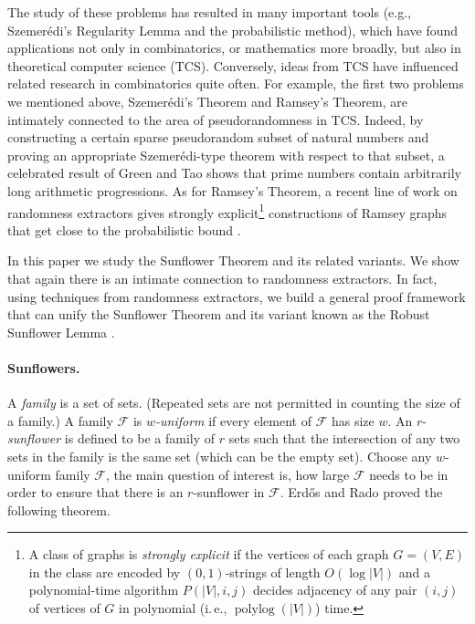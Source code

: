 \documentclass[11pt]{article}
\numberwithin{equation}{section}
\theoremstyle{definition}
\theoremstyle{plain}
\newcommand{\ie}{i.\,e.}
\newcommand{\calF}{\mathcal{F}} %
\DeclareMathOperator{\polylog}{polylog}  %
\begin{document}
The study of these problems has resulted in many important tools (e.g., Szemer\'{e}di's Regularity Lemma \cite{Szemerdi1978}
%
and the probabilistic
method), which have found applications not only in combinatorics, or mathematics more broadly, but also in
theoretical %
computer science (TCS). %
Conversely, ideas from %
TCS   %
have
influenced related research in combinatorics quite often. For example, the first two problems we mentioned above, Szemer\'{e}di's Theorem and
Ramsey's Theorem, are intimately connected to the area of
pseudorandomness in %
TCS.   %
Indeed, by constructing a certain sparse
pseudorandom subset of natural numbers and proving an appropriate Szemer\'{e}di-type theorem with respect to that subset, a celebrated result of
Green and Tao \cite{GreenT2008} shows that prime numbers contain arbitrarily long arithmetic progressions. As for Ramsey's Theorem, a recent line of
work on randomness extractors \cite{barak2005simulating,Li15,CZ16,BDT17,Cohen17,Li17} %
gives  %
%
strongly  %
%
explicit\footnote{\label{footnote:explicit}%
A class of graphs is \emph{strongly explicit}
if the vertices of each graph $G=(V,E)$ in the class
are encoded by $(0,1)$-strings of length $O(\log |V|)$
and a polynomial-time algorithm $P(|V|,i,j)$ decides
adjacency of any pair $(i,j)$ of vertices of $G$ in
polynomial (\ie, $\polylog(|V|)$) time.}
%
%
%
%
%
constructions of Ramsey graphs that
%
get close to %
the probabilistic bound \cite{Erdos1947}.

In this paper we study the Sunflower Theorem and its related variants. We show that again there is an intimate connection to randomness extractors.
In fact, using techniques from randomness extractors, we build a general proof framework that can unify the Sunflower Theorem and its variant
known as the Robust Sunflower Lemma \cite{rossman2010monotone}.

\paragraph{Sunflowers.}
%
A \emph{family} is a set of sets.  (Repeated sets are not permitted
in counting the size of a family.)  A family $\calF$
is \emph{$w$-uniform} if every element of $\calF$
has size $w$.  %
An $r$-\emph{sunflower} is defined to be a family of $r$ sets
%
such that the intersection of any two sets
in the family  %
is the same
set  %
%
(which can be the empty set). Choose any $w$-uniform family $\calF$,
%
%
the main question of interest is, how large
$\calF$ needs to be in order to ensure that there is
%
an $r$-sunflower  %
in $\calF$. Erd\H{o}s and Rado proved the following theorem.
\end{document}
